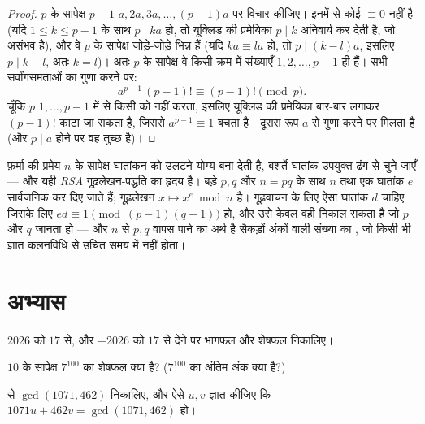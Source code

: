 \begin{proof}
$p$ के सापेक्ष $p - 1$  $a, 2a, 3a, \dots, (p-1)a$ पर विचार कीजिए। इनमें से कोई $\equiv 0$
नहीं है (यदि $1 \leq k \leq p-1$ के साथ $p \mid ka$ हो, तो यूक्लिड की प्रमेयिका $p \mid k$ अनिवार्य
कर देती है, जो असंभव है), और वे $p$ के सापेक्ष जोड़े-जोड़े भिन्न हैं (यदि
$ka \equiv la$ हो, तो $p \mid (k - l)a$, इसलिए $p \mid k - l$, अतः $k = l$)। अतः $p$ के सापेक्ष वे किसी
क्रम में संख्याएँ $1, 2, \dots, p-1$ ही हैं। सभी सर्वांगसमताओं का गुणा करने पर:
\[
a^{p-1}\,(p-1)! \equiv (p-1)! \pmod p .
\]
चूँकि $p$ $1, \dots, p-1$ में से किसी को  नहीं करता, इसलिए यूक्लिड की
प्रमेयिका बार-बार लगाकर $(p-1)!$ काटा जा सकता है, जिससे $a^{p-1} \equiv 1$ बचता है। दूसरा रूप
$a$ से गुणा करने पर मिलता है (और $p \mid a$ होने पर वह तुच्छ है)।
\end{proof}

\begin{example}[गूढ़लेखन में अनुप्रयोग]\label{ex:g12:arith:rsa}
फ़र्मा की प्रमेय $n$ के सापेक्ष घातांकन को उलटने योग्य बना देती है, बशर्ते
घातांक उपयुक्त ढंग से चुने जाएँ --- और यही \emph{RSA} गूढ़लेखन-पद्धति का हृदय
है। बड़े  $p, q$ और $n = pq$ के साथ $n$ तथा एक घातांक $e$ सार्वजनिक कर
दिए जाते हैं; गूढ़लेखन $x \mapsto x^e \bmod n$ है। गूढ़वाचन के लिए ऐसा घातांक $d$ चाहिए जिसके
लिए $ed \equiv 1 \pmod{(p-1)(q-1)}$ हो, और उसे केवल वही निकाल सकता है जो $p$ और $q$ जानता हो ---
और $n$ से $p, q$ वापस पाने का अर्थ है सैकड़ों अंकों वाली संख्या का ,
जो किसी भी ज्ञात कलनविधि से उचित समय में नहीं होता।
\end{example}

\section{अभ्यास}

\begin{exercise}[$\star$]\label{exo:g12:arith:1}
$2026$ को $17$ से, और $-2026$ को $17$ से  देने पर भागफल और शेषफल
निकालिए।
\end{exercise}

\begin{exercise}[$\star$]\label{exo:g12:arith:2}
$10$ के सापेक्ष $7^{100}$ का शेषफल क्या है? ($7^{100}$ का अंतिम अंक क्या है?)
\end{exercise}

\begin{exercise}[$\star$]\label{exo:g12:arith:3}
 से $\gcd(1071, 462)$ निकालिए, और ऐसे  $u, v$ ज्ञात कीजिए कि
$1071u + 462v = \gcd(1071, 462)$ हो।
\end{exercise}

